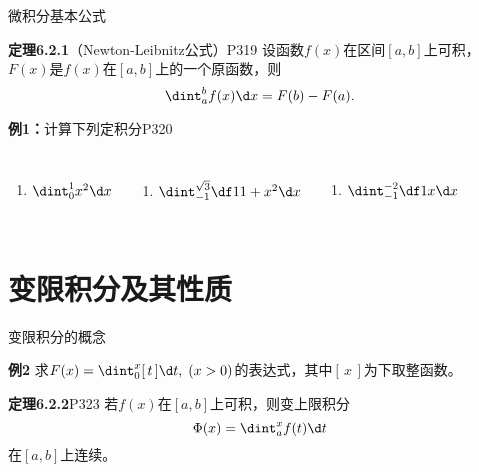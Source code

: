 \begin{frame}{微积分基本公式}
	\linespread{1.2}\pause 
	\begin{block}{{\bf 定理6.2.1}（Newton-Leibnitz公式）\hfill P319}
		设函数$f(x)$在区间$[a,b]$上可积，$F(x)$是$f(x)$在$[a,b]$上的一个原函数，则
		$$\dint_a^bf(x)\d x=F(b)-F(a).$$
	\end{block}\pause 
	\begin{exampleblock}{{\bf 例1：}计算下列定积分\hfill P320}
		\begin{columns}
			\begin{enumerate}\pause 
			  \item $\dint_{0}^{1}x^2 \d x$
			\end{enumerate}
			\begin{enumerate}\pause 
			  \addtocounter{enumi}{1}
			  \item $\dint_{-1}^{\sqrt 3}\df 1{1+x^2}\d x$
			\end{enumerate}
			\begin{enumerate}\pause 
			  \addtocounter{enumi}{2}
			  \item $\dint_{-1}^{-2}\df 1x\d x$
			\end{enumerate}
		\end{columns}
	\end{exampleblock}
\end{frame}

\section{变限积分及其性质}

\begin{frame}{变限积分的概念}
	\linespread{1.2}\pause 
	\begin{exampleblock}{{\bf 例2}\hfill }
		求$F(x)=\dint_0^x[\,t\,]\d t,\;(x>0)$的表达式，其中$[\,x\,]$为下取整函数。
	\end{exampleblock}\pause 
	\begin{block}{{\bf 定理6.2.2}\hfill P323}
		若$f(x)$在$[a,b]$上可积，则{\bb 变上限积分}
		$$\Phi(x)=\dint_a^xf(t)\d t$$
		在$[a,b]$上连续。
	\end{block}
\end{frame}

